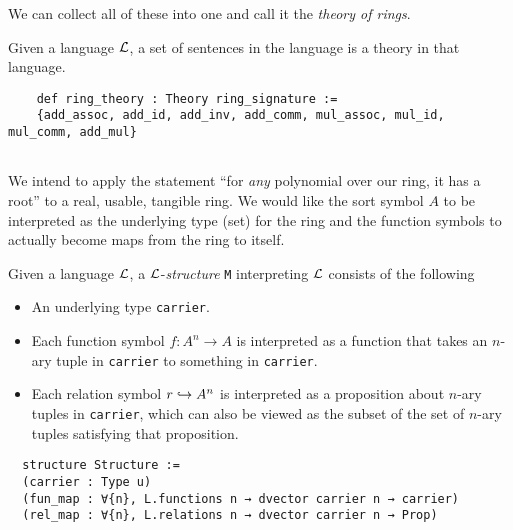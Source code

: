 We can collect all of these into one and call it the \textit{theory of rings}.

\begin{dfn}[Theory]
  Given a language $\mathcal{L}$,
  a set of sentences in the language is a theory in that language.
\end{dfn}

\begin{dfn}

  \begin{lstlisting}
    def ring_theory : Theory ring_signature :=
    {add_assoc, add_id, add_inv, add_comm, mul_assoc, mul_id, mul_comm, add_mul}


  \end{lstlisting}


\end{dfn}

We intend to apply the statement
``for \textit{any} polynomial over our ring, it has a root''
to a real, usable, tangible ring.
We would like the sort symbol $A$ to be interpreted as the underlying type (set)
for the ring and the function symbols to actually become maps from the ring to itself.

\begin{dfn}
    Given a language $\mathcal{L}$, a $\mathcal{L}$-\textit{structure} \texttt{M}
    interpreting $\mathcal{L}$ consists of the following
    \begin{itemize}
      \item An underlying type \texttt{carrier}.
      \item Each function symbol $f : A^{n} \to A$ is interpreted as a
            function that takes an $n$-ary tuple in \texttt{carrier}
            to something in \texttt{carrier}.
      \item Each relation symbol $r \hookrightarrow A^{n}$
            is interpreted as a proposition about $n$-ary tuples in \texttt{carrier},
            which can also be viewed as the subset of the set of $n$-ary tuples
            satisfying that proposition.
    \end{itemize}

  \begin{lstlisting}
  structure Structure :=
  (carrier : Type u)
  (fun_map : ∀{n}, L.functions n → dvector carrier n → carrier)
  (rel_map : ∀{n}, L.relations n → dvector carrier n → Prop)\end{lstlisting}
\end{dfn}



